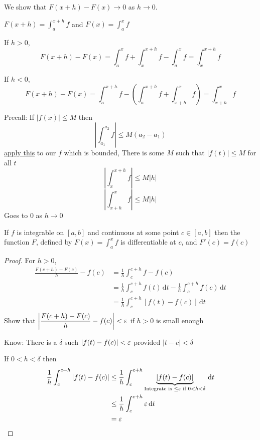 We show that $F(x+h) - F(x) \to 0$ as $h \to 0$.

$\displaystyle F(x+h) = \int_a^{x+h} f$ and 
$\displaystyle F(x) = \int_a^{x} f$

If $h > 0$, $$\displaystyle F(x+h) - F(x) = \int_a^x f + \int_x^{x+h} f - \int_a^x f = \int_x^{x+h} f$$

If $h < 0$, $$\displaystyle F(x+h) - F(x) = \int_a^{x+h} f -\left( \int_a^{x+h} f + \int_{x+h}^x f\right) = \int_{x+h}^{x} f$$

Precall: If $|f(x)| \le M$ then 
\[\left|\int_{a_1}^{a_2} f\right| \le M(a_2 - a_1)\]
\underline{apply this} to our $f$ which is bounded, There is some  $M$ such that $|f(t)| \le M$ for all $t$
\[\left|\int_{x}^{x+h} f\right| \le M|h|\]
\[\left|\int_{x+h}^{x} f\right| \le M|h|\]
Goes to $0$ as $h \to 0$

\begin{theorem*}
  If $f$ is integrable on $[a, b]$ and continuous at some point $c \in [a, b]$ then the function
  $F$, defined by $\displaystyle F(x) = \int_a^x f$ is differentiable at $c$, and $F'(c) = f(c)$ 
\end{theorem*}

\begin{proof}
  For $h > 0$,
  \begin{align*}
    \frac{F(c+h)-F(c)}{h} - f(c) &= \frac{1}{h}\int_c^{c+h} f - f(c) \\
    &= \frac{1}{h} \int_c^{c+h} f(t) \,\mathrm{d}t - \frac{1}{h}\int_c^{c+h} f(c)\,\mathrm{d}t \\
    &= \frac{1}{h} \int_c^{c+h}[f(t) - f(c)]\,\mathrm{d}t \\
  \end{align*}
  Show that $\displaystyle \left|\frac{F(c+h) - F(c)}{h} - f(c)\right| < \varepsilon$ if $h>0$ is small enough

  Know: There is a $\delta$ such $|f(t) - f(c)| < \varepsilon$ provided $|t-c| < \delta$

  If $0  < h < \delta$ then 
  \begin{align*}
    \frac{1}{h} \int_c^{c+h} |f(t) - f(c)| &\le\frac{1}{h} \int_c^{c+h} \underbrace{|f(t)-f(c)|}_{\text{Integrate is } \le \varepsilon \text{ if } 0 < h < \delta}\,\mathrm{d}t \\ 
    &\le \frac{1}{h} \int_c^{c+h} \varepsilon \,\mathrm{d}t \\
    &= \varepsilon
  \end{align*}
\end{proof}

